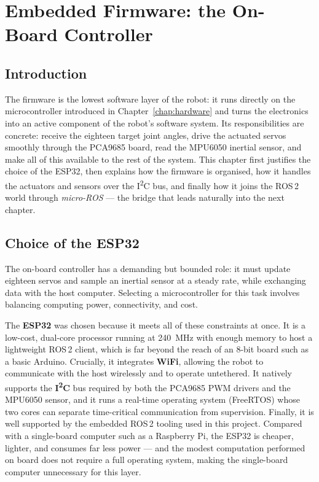 \chapter{Embedded Firmware: the On-Board Controller}
\label{chap:firmware}

\section{Introduction}
The firmware is the lowest software layer of the robot: it runs directly
on the microcontroller introduced in Chapter~\ref{chap:hardware} and
turns the electronics into an active component of the robot's software
system. Its responsibilities are concrete: receive the eighteen target
joint angles, drive the actuated servos smoothly through the PCA9685
board, read the MPU6050 inertial sensor, and make all of this available to the
rest of the system. This chapter first justifies the choice of the ESP32,
then explains how the firmware is organised, how it handles the actuators
and sensors over the I\textsuperscript{2}C bus, and finally how it joins
the ROS\,2 world through \emph{micro-ROS} --- the bridge that leads
naturally into the next chapter.

\section{Choice of the ESP32}
\label{sec:choice-esp}
The on-board controller has a demanding but bounded role: it must update
eighteen servos and sample an inertial sensor at a steady rate, while
exchanging data with the host computer. Selecting a microcontroller for
this task involves balancing computing power, connectivity, and cost.

The \textbf{ESP32} was chosen because it meets all of these constraints
at once. It is a low-cost, dual-core processor running at 240~MHz with
enough memory to host a lightweight ROS\,2 client, which is far beyond
the reach of an 8-bit board such as a basic Arduino. Crucially, it
integrates \textbf{WiFi}, allowing the robot to communicate with the host
wirelessly and to operate untethered. It natively supports the
\textbf{I\textsuperscript{2}C} bus required by both the PCA9685 PWM
drivers and the MPU6050 sensor, and it runs a real-time operating system
(FreeRTOS) whose two cores can separate time-critical communication from
supervision. Finally, it is well supported by the embedded ROS\,2
tooling used in this project. Compared with a single-board computer such
as a Raspberry Pi, the ESP32 is cheaper, lighter, and consumes far less
power --- and the modest computation performed on board does not require
a full operating system, making the single-board computer unnecessary
for this layer.

